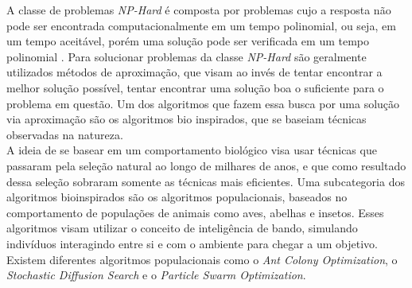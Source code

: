 \indent A classe de problemas \textit{NP-Hard} é composta por problemas cujo a resposta não pode ser encontrada computacionalmente em um tempo polinomial, ou seja, em um tempo aceitável, porém uma solução pode ser verificada em um tempo polinomial \cite{Eswaramurthy2008}.
Para solucionar problemas da classe \textit{NP-Hard} são geralmente utilizados métodos de aproximação, que visam ao invés de tentar encontrar a melhor solução possível, tentar encontrar uma solução boa o suficiente para o problema em questão.
Um dos algoritmos que fazem essa busca por uma solução via aproximação são os algoritmos bio inspirados, que se baseiam técnicas observadas na natureza.\\
\indent A ideia de se basear em um comportamento biológico visa usar técnicas que passaram pela seleção natural ao longo de milhares de anos, e que como resultado dessa seleção sobraram somente as técnicas mais eficientes.
Uma subcategoria dos algoritmos bioinspirados são os algoritmos populacionais, baseados no comportamento de populações de animais como aves, abelhas e insetos.
Esses algoritmos visam utilizar o conceito de inteligência de bando, simulando indivíduos interagindo entre si e com o ambiente para chegar a um objetivo.
Existem diferentes algoritmos populacionais como o \textit{Ant Colony Optimization}, o \textit{Stochastic Diffusion Search} e o \textit{Particle Swarm Optimization}.
